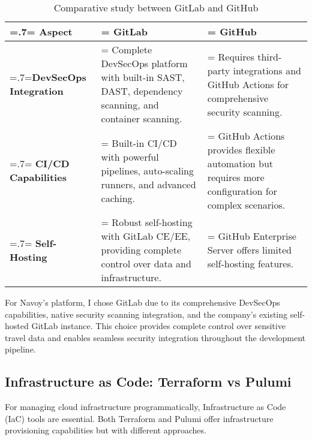\begin{table}[H]
    \renewcommand{\arraystretch}{1.5}%
    \caption{Comparative study between GitLab and GitHub}
    \centering
    \medskip
    \begin{tabularx}{1\textwidth} {
            | >{\hsize=.7\hsize\linewidth=\hsize\centering\arraybackslash}X
            | >{\hsize=1.15\hsize\linewidth=\hsize\justifying\arraybackslash}X
            | >{\hsize=1.15\hsize\linewidth=\hsize\justifying\arraybackslash}X |}
        \hline
        \rowcolor{primary} \textbf {Aspect} & \textbf {GitLab}                                                                                             & \textbf {GitHub}                                                                                             \\
        \hline
        \textbf {DevSecOps Integration}     & \noindent Complete DevSecOps platform with built-in SAST, DAST, dependency scanning, and container scanning. & \noindent Requires third-party integrations and GitHub Actions for comprehensive security scanning.          \\
        \hline
        \textbf {CI/CD Capabilities}        & \noindent Built-in CI/CD with powerful pipelines, auto-scaling runners, and advanced caching.                & \noindent GitHub Actions provides flexible automation but requires more configuration for complex scenarios. \\
        \hline
        \textbf {Self-Hosting}              & \noindent Robust self-hosting with GitLab CE/EE, providing complete control over data and infrastructure.    & \noindent GitHub Enterprise Server offers limited self-hosting features.                                     \\
        \hline
    \end{tabularx}
\end{table}

For Navoy's platform, I chose GitLab due to its comprehensive DevSecOps capabilities, native security scanning integration, and the company's existing self-hosted GitLab instance. This choice provides complete control over sensitive travel data and enables seamless security integration throughout the development pipeline.

\subsection{Infrastructure as Code: Terraform vs Pulumi}
For managing cloud infrastructure programmatically, Infrastructure as Code (IaC) tools are essential. Both Terraform and Pulumi offer infrastructure provisioning capabilities but with different approaches.

